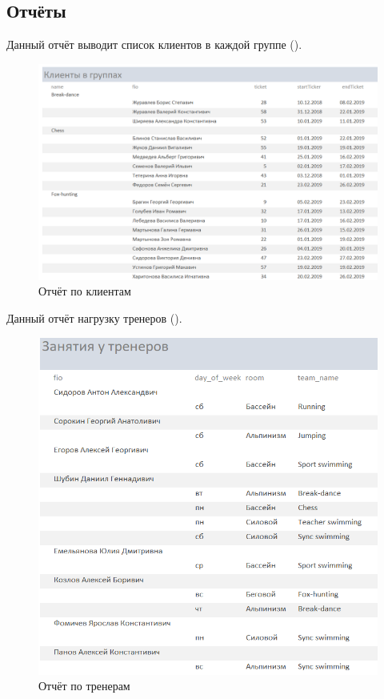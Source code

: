 \documentclass[a4paper,14pt]{article}
\begin{document}
	
	
\subsection{Отчёты}

	Данный отчёт выводит список клиентов в каждой группе ().

	\begin{figure}[H]
		\centering		
		\includegraphics[width=\linewidth]{image/5_report_client_team}
		\caption{Отчёт по клиентам}\label{img:5_report_client_team}
	\end{figure}

	Данный отчёт нагрузку тренеров ().

	\begin{figure}[H]
		\centering		
		\includegraphics[width=\linewidth]{image/5_report_coach_scheduler}
		\caption{Отчёт по тренерам}\label{img:5_report_coach_scheduler}
	\end{figure}
\end{document}
